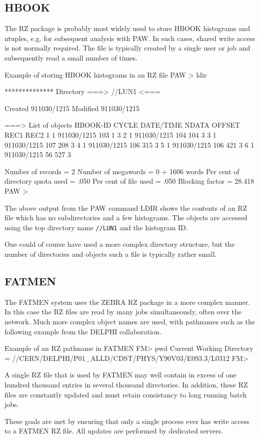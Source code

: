 \subsection{HBOOK}
\par
The RZ package is probably most widely used to store HBOOK 
histograms and ntuples, e.g. for subsequent analysis
with PAW. 
In such cases, shared write access is not normally
required. The file is typically created by a single user
or job and subsequently read a small number of times.
\begin{XMPt}{Example of storing HBOOK histograms in an RZ file}
PAW > ldir



 ************** Directory ===> //LUN1 <===

                  Created 911030/1215  Modified 911030/1215


 ===> List of objects 
     HBOOK-ID  CYCLE   DATE/TIME   NDATA   OFFSET    REC1    REC2     
          1       1   911030/1215    103       1       3    
          2       1   911030/1215    104     104       3    
          3       1   911030/1215    107     208       3    
          4       1   911030/1215    106     315       3    
          5       1   911030/1215    106     421       3    
          6       1   911030/1215     56     527       3    

  Number of records =    2  Number of megawords =  0 +  1606 words
  Per cent of directory quota used =    .050
  Per cent of file used            =    .050
  Blocking factor                  =  28.418
 PAW >
\end{XMPt}
\par
The above output from the PAW command LDIR shows the contents
of an RZ file which has no subdirectories and a few histograms.
The objects are accessed using the top directory name {\tt //LUN1}
and the histogram ID. 
\par
One could of course have used a more complex directory structure,
but the number of directories and objects such a file is typically
rather small.
\subsection{FATMEN}
\par
The FATMEN system uses the ZEBRA RZ package in a more complex manner.
In this case the RZ files are read by many jobs simultaneously,
often over the network. Much more complex object names are used,
with pathnames such as the following example from the DELPHI 
collaboration. 
\begin{XMPt}{Example of an RZ pathname in FATMEN}
FM> pwd
Current Working Directory = //CERN/DELPHI/P01_ALLD/CDST/PHYS/Y90V03/E093.3/L0312
FM>
\end{XMPt}
A single RZ file that is used by FATMEN may well
contain in excess of one hundred thousand 
entries in several thousand directories.
In addition, these RZ files are constantly updated and must
retain consistancy to long running batch jobs.
\par
These goals are met by ensuring that only a single process ever
has write access to a FATMEN RZ file. All updates are performed
by dedicated servers.
